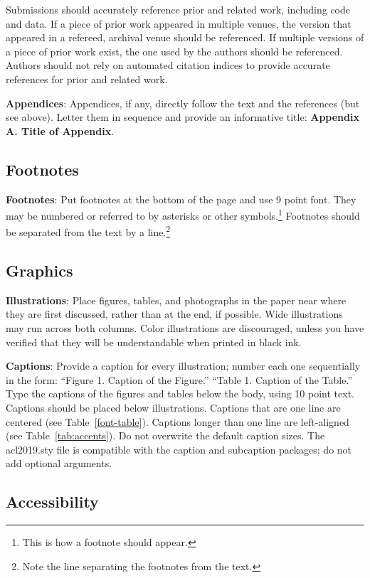 \documentclass[11pt,a4paper]{article}
\begin{document}
Submissions should accurately reference prior and related work, including code and data. If a piece of prior work appeared in multiple venues, the version that appeared in a refereed, archival venue should be referenced. If multiple versions of a piece of prior work exist, the one used by the authors should be referenced. Authors should not rely on automated citation indices to provide accurate references for prior and related work.

\textbf{Appendices}: Appendices, if any, directly follow the text and the
references (but see above).  Letter them in sequence and provide an
informative title: \textbf{Appendix A. Title of Appendix}.

\subsection{Footnotes}

\textbf{Footnotes}: Put footnotes at the bottom of the page and use 9
point font. They may be numbered or referred to by asterisks or other
symbols.\footnote{This is how a footnote should appear.} Footnotes
should be separated from the text by a line.\footnote{Note the line
separating the footnotes from the text.}

\subsection{Graphics}

\textbf{Illustrations}: Place figures, tables, and photographs in the
paper near where they are first discussed, rather than at the end, if
possible.  Wide illustrations may run across both columns.  Color
illustrations are discouraged, unless you have verified that  
they will be understandable when printed in black ink.

\textbf{Captions}: Provide a caption for every illustration; number each one
sequentially in the form:  ``Figure 1. Caption of the Figure.'' ``Table 1.
Caption of the Table.''  Type the captions of the figures and 
tables below the body, using 10 point text. Captions should be placed below illustrations. Captions that are one line are centered (see Table~\ref{font-table}). Captions longer than one line are left-aligned (see Table~\ref{tab:accents}). Do not overwrite the default caption sizes. The acl2019.sty file is compatible with the caption and subcaption packages; do not add optional arguments.


\subsection{Accessibility}
\label{ssec:accessibility}
\end{document}

